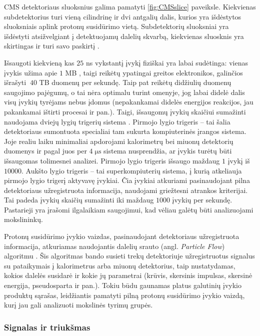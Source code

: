 \documentclass[a4paper, 12pt, oneside]{article}
\begin{document}
CMS detektoriaus sluoksnius galima pamatyti \ref{fig:CMSslice} paveiksle.
Kiekvienas subdetektorius turi vieną cilindrinę ir dvi antgalių dalis, kurios yra išdėstytos sluoksniais
aplink protonų susidūrimo vietą.
Subdetektorių sluoksniai yra išdėstyti atsižvelgiant į detektuojamų dalelių skvarbą, kiekvienas sluosknis
yra skirtingas ir turi savo paskirtį \cite{CMSexperiment}.

Išsaugoti kiekvieną kas $25$ ns vykstantį įvykį fiziškai yra labai sudėtinga: vienas įvykis užima apie
$1$ MB \cite{CMScomputing}, taigi reikėtų ypatingai greitos elektronikos, galinčios išrašyti $~40$ TB duomenų
per sekundę.
Taip pat reikėtų didžiulių duomenų saugojimo pajėgumų, o tai nėra optimalu turint omenyje, jog labai didelė dalis
visų įvykių tyrėjams nebus įdomus (nepakankamai didelės energijos reakcijos, jau pakankamai ištirti procesai ir pan.).
Taigi, išsaugomų įvykių skaičiui sumažinti naudojama dviejų lygių trigerių sistema \cite{CMStrig}.
Pirmojo lygio trigeris -- tai šalia detektoriaus sumontuota specialiai tam sukurta kompiuterinės
įrangos sistema.
Joje realiu laiku minimaliai apdorojami kalorimetrų bei miuonų detektorių duomenys ir pagal juos per
$4 \; \mathrm{\mu s}$ sistema nusprendžia, ar įvykis turėtų būti išsaugomas tolimesnei analizei. 
Pirmojo lygio trigeris išsaugo maždaug $1$ įvykį iš $10000$.
Aukšto lygio trigeris -- tai superkompiuterių sistema, į kurią atkeliauja pirmojo lygio trigerį
aktyvavę įvykiai.
Čia įvykiai atkuriami pasinaudojant pilna detektoriaus užregistruota informacija, naudojami
griežtesni atrankos kriterijai.
Tai padeda įvykių skaičių sumažinti iki maždaug $1000$ įvykių per sekundę.
Pastarieji yra įrašomi ilgalaikiam saugojimui, kad vėliau galėtų būti analizuojami mokslininkų.

Protonų susidūrimo įvykio vaizdas, pasinaudojant detektoriaus užregistruota informacija, atkuriamas naudojantis
dalelių srauto (angl. \textit{Particle Flow}) algoritmu \cite{ParticleFlow}.
Šis algoritmas bando susieti trekų detektoriuje užregistruotus signalus su pataikymais į kalorimetrus arba miuonų
detektorius, taip nustatydamas, kokios dalelės susidarė ir kokie jų parametrai (krūvis, skersinis impulsas,
skersinė energija, pseudosparta ir pan.).
Tokiu būdu gaunamas platus galutinių įvykio produktų sąrašas, leidžiantis pamatyti pilną protonų susidūrimo įvykio vaizdą,
kurį jau gali analizuoti mokslinės tyrimų grupės.

\subsubsection{Signalas ir triukšmas}
\end{document}
